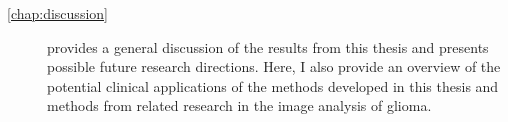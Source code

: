 \begin{description}
    \item[\cref{chap:discussion}] provides a general discussion of the results from this thesis and presents possible future research directions.
    Here, I also provide an overview of the potential clinical applications of the methods developed in this thesis and methods from related research in the image analysis of glioma.

\end{description}


